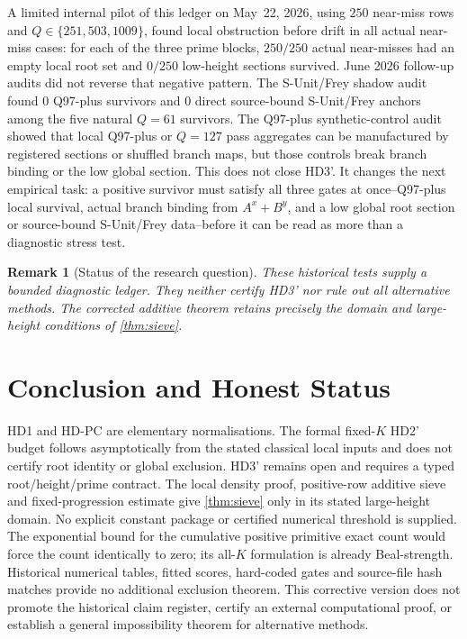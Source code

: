 \documentclass[11pt,a4paper]{article}
\newtheorem{remark}[theorem]{Remark}
\begin{document}
A limited internal pilot of this ledger on May~22, 2026, using $250$
near-miss rows and $Q\in\{251,503,1009\}$, found local obstruction
before drift in all actual near-miss cases: for each of the three prime
blocks, $250/250$ actual near-misses had an empty local root set and
$0/250$ low-height sections survived. June 2026 follow-up audits did
not reverse that negative pattern. The S-Unit/Frey shadow audit found
$0$ Q97-plus survivors and $0$ direct source-bound S-Unit/Frey anchors
among the five natural $Q=61$ survivors. The Q97-plus synthetic-control
audit showed that local Q97-plus or $Q=127$ pass aggregates can be
manufactured by registered sections or shuffled branch maps, but those
controls break branch binding or the low global section. This does not
close HD3'. It changes the next empirical task: a positive survivor
must satisfy all three gates at once--Q97-plus local survival, actual
branch binding from $A^x+B^y$, and a low global root section or
source-bound S-Unit/Frey data--before it can be read as more than a
diagnostic stress test.

\begin{remark}[Status of the research question]
These historical tests supply a bounded diagnostic ledger.
They neither certify HD3' nor rule out all alternative methods.
The corrected additive theorem retains precisely the domain and
large-height conditions of \cref{thm:sieve}.
\end{remark}

\section{Conclusion and Honest Status}

HD1 and HD-PC are elementary normalisations. The formal fixed-$K$
HD2' budget follows asymptotically from the stated classical local
inputs and does not certify root identity or global exclusion.
HD3' remains open and requires a typed root/height/prime contract.
The local density proof, positive-row additive sieve and
fixed-progression estimate give \cref{thm:sieve} only in its stated
large-height domain. No explicit constant package or certified
numerical threshold is supplied.
The exponential bound for the cumulative positive primitive exact
count would force the count identically to zero; its all-$K$
formulation is already Beal-strength.
Historical numerical tables, fitted scores, hard-coded gates and
source-file hash matches provide no additional exclusion theorem.
This corrective version does not promote the historical claim
register, certify an external computational proof, or establish a
general impossibility theorem for alternative methods.
\end{document}
